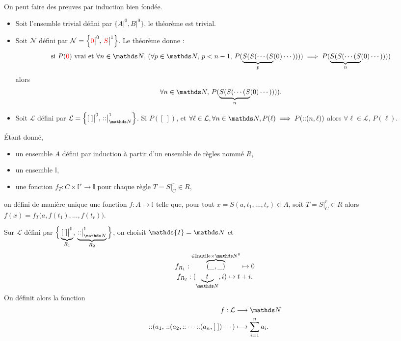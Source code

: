 \begin{rmk}
	On peut faire des preuves par induction bien fondée.
\end{rmk}

\begin{exm}
	\begin{itemize}
		\item Soit l'ensemble trivial défini par $\Big\{A\big|^0, B\big|^0\Big\}$, le théorème est trivial.
		\item Soit $\mathcal{N}$\/ défini par $\mathcal{N} = \Big\{{\color{red}0}\big|^0,\,{\color{red}S}\big|^1\Big\}$. Le théorème donne : \[
				\text{si } P(\red 0) \text{ vrai et } \forall n \in \N,\,(\forall p \in \N,\,p < n - 1,\,P(\underbrace{S(S(\cdots(S}_{p}(0)\cdots)))) \implies P(\underbrace{S(S(\cdots(S}_{n}(0)\cdots))))
			\] alors \[
				\forall n \in \N,\,P(\underbrace{S(S(\cdots(S}_{n}(0)\cdots))))
			.\] 
		\item Soit $\mathcal{L}$\/ défini par $\mathcal{L} = \Big\{[~]\big|^0,\,{::}\big|^1_{\N}\Big\} $. Si $P([~])$, et $\forall \ell \in \mathcal{L},\forall n \in \N, P(\ell) \implies P({::}(n, \ell))$\/ alors $\forall \ell \in \mathcal{L},\,P(\ell)$.
	\end{itemize}
\end{exm}

\begin{prop}
	Étant donné,
	\begin{itemize}
		\item un ensemble $A$\/ défini par induction à partir d'un ensemble de règles nommé $R$,
		\item un ensemble $\mathds{I}$,
		\item une fonction $f_T : C \times \mathds{I}^r  \to  \mathds{I}$\/ pour chaque règle $T = S\big|^r_C \in R$,
	\end{itemize}
	on défini de manière unique une fonction $f : A \to \mathds{I}$\/ telle que, pour tout $x = S(a, t_1, \ldots, t_r) \in A$, soit $T = S\big|_C^r \in R$\/ alors $f(x) = f_T\big(a, f(t_1), \ldots, f(t_r)\big)$.
\end{prop}

\begin{exm}
	Sur $\mathcal{L}$\/ défini par $\Big\{\underbrace{[~]\big|^0}_{R_1},\,\underbrace{{::}\big|_{\N}^1}_{R_2}\Big\}$, on choisit $\mathds{I} = \N$\/ et
	\begin{gather*}
		f_{R_1} : \overbrace{(\_,\_)}^{\in \text{Inutile} \times  \N^0} \mapsto 0\\
		f_{R_2} : (\underbrace{t}_{\N}, i) \mapsto t + i.
	\end{gather*}
	On définit alors la fonction \begin{align*}
		f: \mathcal{L} &\longrightarrow \N \\
		{::}(a_1,\,{::}(a_2, {::}\cdots{::}(a_n, [~])\cdots)&\longmapsto \sum_{i=1}^n a_i.
	\end{align*}
\end{exm}


